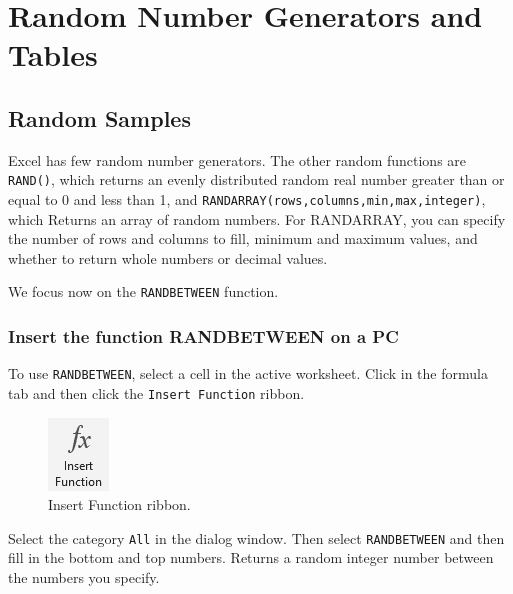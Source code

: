 \documentclass[
]{book}
\begin{document}
\hypertarget{number-gen}{%
\chapter{Random Number Generators and Tables}\label{number-gen}}

\hypertarget{random-samples}{%
\section{Random Samples}\label{random-samples}}

Excel has few random number generators. The other random functions are \texttt{RAND()}, which returns an evenly distributed random real number greater than or equal to 0 and less than 1, and \texttt{RANDARRAY(rows,columns,min,max,integer)}, which Returns an array of random numbers. For RANDARRAY, you can specify the number of rows and columns to fill, minimum and maximum values, and whether to return whole numbers or decimal values.

We focus now on the \texttt{RANDBETWEEN} function.

\hypertarget{insert-the-function-randbetween-on-a-pc}{%
\subsection{Insert the function RANDBETWEEN on a PC}\label{insert-the-function-randbetween-on-a-pc}}

To use \texttt{RANDBETWEEN}, select a cell in the active worksheet. Click in the formula tab and then click the \texttt{Insert\ Function} ribbon.

\begin{figure}

{\centering \includegraphics[width=0.1\linewidth]{fx-pc} 

}

\caption{Insert Function ribbon.}\label{fig:function-button}
\end{figure}

Select the category \texttt{All} in the dialog window. Then select \texttt{RANDBETWEEN} and then fill in the bottom and top numbers. Returns a random integer number between the numbers you specify.
\end{document}
